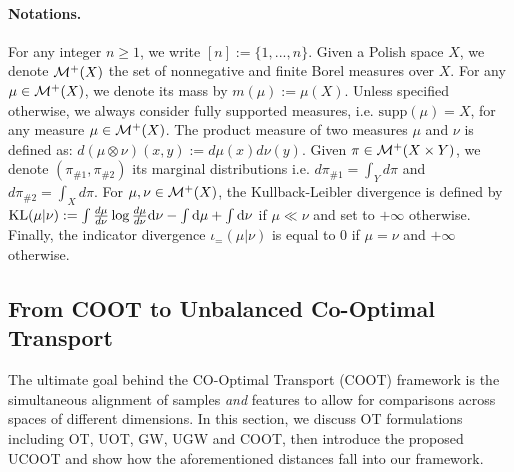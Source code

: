 \paragraph{Notations.} For any integer $n \geq 1$, we write $[n] := \{1,...,n\}$.
Given a Polish space $X$, we denote $\mathcal M^+(X)$ the set of nonnegative and finite Borel
measures over $X$. For any $\mu \in \mathcal M^+(X)$, we denote
its mass by $m(\mu) := \mu(X)$.
Unless specified otherwise, we always consider fully supported measures,
i.e. $\text{supp}(\mu) = X$, for any measure $\mu \in \mathcal M^+(X)$.
The product measure of two measures $\mu$ and $\nu$ is defined as:
$d (\mu \otimes \nu)(x,y) := d\mu(x) d\nu(y)$.
Given $\pi \in \mathcal M^{+}(X \times Y)$, we denote
$(\pi_{\#1}, \pi_{\#2})$ its marginal distributions i.e. $d\pi_{\#1} = \int_{Y} d\pi$ and
$d\pi_{\#2} = \int_{X} d\pi$.
For $\mu, \nu \in \mathcal M^+(X)$, the Kullback-Leibler divergence is defined by
$\text{KL}(\mu|\nu) := \int \frac{d \mu}{ d \nu} \log \frac{d \mu}{ d \nu} \mathrm d\nu
- \int \mathrm d\mu + \int \mathrm d\nu$ if $\mu \ll \nu$ and set to $+\infty$ otherwise.
Finally, the indicator divergence $\iota_{=}(\mu | \nu)$ is equal to 0 if $\mu = \nu$
and $+\infty$ otherwise.


\subsection{From COOT to Unbalanced Co-Optimal Transport} \label{sec:ucoot}
The ultimate goal behind the CO-Optimal Transport (COOT)
framework is the simultaneous alignment of samples \emph{and} features to allow for
comparisons across spaces of different dimensions. In this section, we discuss
OT formulations including OT, UOT, GW, UGW and COOT, then introduce the proposed UCOOT
and show how the aforementioned distances fall into our framework.


